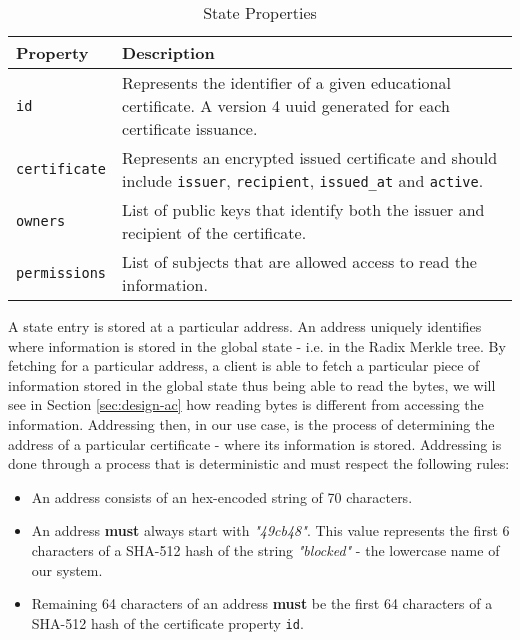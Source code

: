 {
\renewcommand{\arraystretch}{1.5}%
\begin{table}[htb]
	\centering
	\caption{State Properties}
	\label{tab:stateProperties}
	\begin{tabular}{p{}|p{}}
		\hline \bf Property  & \bf Description                                                                                                                             \\ \hline
		\texttt{id}          & Represents the identifier of a given educational certificate. A version 4 \gls{uuid} generated for each certificate issuance.               \\ \hline
		\texttt{certificate} & Represents an encrypted issued certificate and should include \texttt{issuer}, \texttt{recipient}, \texttt{issued\_at} and \texttt{active}. \\ \hline
		\texttt{owners}      & List of public keys that identify both the issuer and recipient of the certificate.                                                         \\ \hline
		\texttt{permissions} & List of subjects that are allowed access to read the information.                                                                           \\
		\hline
	\end{tabular}
\end{table}
}

A state entry is stored at a particular address. An address uniquely identifies where information is stored in the global state - i.e. in the Radix Merkle tree. By fetching for a particular address, a client is able to fetch a particular piece of information stored in the global state thus being able to read the bytes, we will see in Section \ref{sec:design-ac} how reading bytes is different from accessing the information. Addressing then, in our use case, is the process of determining the address of a particular certificate - where its information is stored. Addressing is done through a process that is deterministic and must respect the following rules:

\begin{itemize}
	\item An address consists of an hex-encoded string of 70 characters.
	\item An address \textbf{must} always start with \emph{"49cb48"}. This value represents the first 6 characters of a SHA-512 hash of the string \emph{"blocked"} - the lowercase name of our system.
	\item Remaining 64 characters of an address \textbf{must} be the first 64 characters of a SHA-512 hash of the certificate property \texttt{id}.
\end{itemize}

